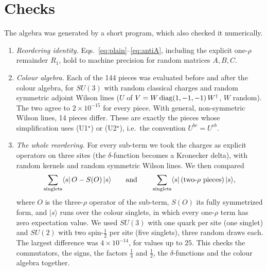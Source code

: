 \documentclass[10pt]{article}
\numberwithin{equation}{section}
\begin{document}
\section{Checks}\label{app:checks}
The algebra was generated by a short program, which also checked it numerically.
\begin{enumerate}
\item \emph{Reordering identity.} Eqs.~\eqref{eq:plain}--\eqref{eq:antiA}, including the explicit one-$\rho$ remainder $R_1$, hold to machine precision for random matrices $A,B,C$.
\item \emph{Colour algebra.} Each of the 144 pieces was evaluated before and after the colour algebra, for $SU(3)$ with random classical charges and random symmetric adjoint Wilson lines ($U$ of $V=W\,{\rm diag}(1,-1,-1)\,W^\dagger$, $W$ random). The two agree to $2\times10^{-15}$ for every piece. With general, non-symmetric Wilson lines, 14 pieces differ. These are exactly the pieces whose simplification uses (U1$^\star$) or (U2$^\star$), i.e.\ the convention $U^{bc}=U^{cb}$.
\item \emph{The whole reordering.} For every sub-term we took the charges as explicit operators on three sites (the $\delta$-function becomes a Kronecker delta), with random kernels and random symmetric Wilson lines. We then compared
\begin{equation*}
\sum_{\rm singlets}\langle s|\,O-S(O)\,|s\rangle\qquad\text{and}\qquad\sum_{\rm singlets}\langle s|\,(\text{two-}\rho\text{ pieces})\,|s\rangle ,
\end{equation*}
where $O$ is the three-$\rho$ operator of the sub-term, $S(O)$ its fully symmetrized form, and $|s\rangle$ runs over the colour singlets, in which every one-$\rho$ term has zero expectation value. We used $SU(3)$ with one quark per site (one singlet) and $SU(2)$ with two spin-$\frac12$ per site (five singlets), three random draws each. The largest difference was $4\times10^{-14}$, for values up to $25$. This checks the commutators, the signs, the factors $\frac14$ and $\frac12$, the $\delta$-functions and the colour algebra together.
\end{enumerate}
\end{document}
